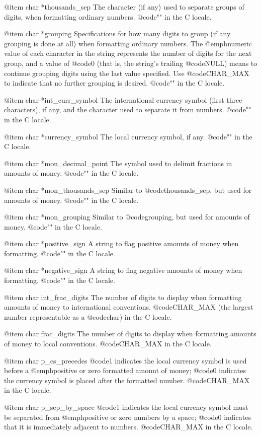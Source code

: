 @item char *thousands_sep
The character (if any) used to separate groups of digits, when
formatting ordinary numbers.
@code{""} in the C locale.

@item char *grouping
Specifications for how many digits to group (if any grouping is done at
all) when formatting ordinary numbers.  The @emph{numeric value} of each
character in the string represents the number of digits for the next
group, and a value of @code{0} (that is, the string's trailing
@code{NULL}) means to continue grouping digits using the last value
specified.  Use @code{CHAR_MAX} to indicate that no further grouping is
desired.  @code{""} in the C locale. 

@item char *int_curr_symbol
The international currency symbol (first three characters), if any, and
the character used to separate it from numbers.
@code{""} in the C locale.

@item char *currency_symbol
The local currency symbol, if any.
@code{""} in the C locale.

@item char *mon_decimal_point
The symbol used to delimit fractions in amounts of money.
@code{""} in the C locale.

@item char *mon_thousands_sep
Similar to @code{thousands_sep}, but used for amounts of money.
@code{""} in the C locale.

@item char *mon_grouping
Similar to @code{grouping}, but used for amounts of money.
@code{""} in the C locale.

@item char *positive_sign
A string to flag positive amounts of money when formatting.
@code{""} in the C locale.

@item char *negative_sign
A string to flag negative amounts of money when formatting.
@code{""} in the C locale.

@item char int_frac_digits
The number of digits to display when formatting amounts of money to
international conventions.
@code{CHAR_MAX} (the largest number representable as a @code{char}) in
the C locale. 

@item char frac_digits
The number of digits to display when formatting amounts of money to
local conventions.
@code{CHAR_MAX} in the C locale. 

@item char p_cs_precedes
@code{1} indicates the local currency symbol is used before a
@emph{positive or zero} formatted amount of money; @code{0} indicates
the currency symbol is placed after the formatted number.
@code{CHAR_MAX} in the C locale. 

@item char p_sep_by_space
@code{1} indicates the local currency symbol must be separated from
@emph{positive or zero} numbers by a space; @code{0} indicates that it
is immediately adjacent to numbers.
@code{CHAR_MAX} in the C locale. 

